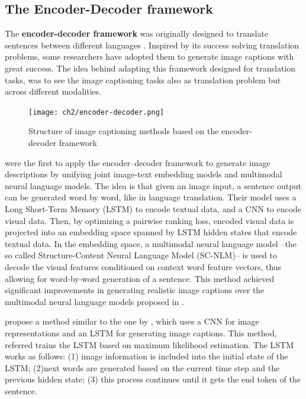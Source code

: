 \subsection{The Encoder-Decoder framework}\label{subsec:encoder-decoder_framework}

The \textbf{encoder-decoder framework} was originally designed to translate sentences between different languages \citep{Kalchbrenner2013, Sutskever2014, Cho2014}. Inspired by its success solving translation problems, some researchers have adopted them to generate image captions with great success. The idea behind adapting this framework designed for translation tasks, was to see the image captioning tasks also as translation problem but across different modalities. 

\begin{figure}[hpt]
	\centering
	\texttt{[image: ch2/encoder-decoder.png]}
	\caption{Structure of image captioning methods based on the encoder-decoder framework}
	\label{fig:encoder-decoder}
\end{figure}

\citet{Kiros2014_LBL} were the first to apply the encoder–decoder framework to generate image descriptions by unifying joint image-text embedding models and multimodal neural language models. The idea is that given an image input, a sentence output can be generated word by word, like in language translation. Their model uses a Long Short-Term Memory (LSTM) \citep{Hochreiter1997} to encode textual data, and a CNN to encode visual data. Then, by optimizing a pairwise ranking loss, encoded visual data is projected into an embedding space spanned by LSTM  hidden states that encode textual data. In the embedding space, a multimodal neural language model --the so called Structure-Content Neural Language Model (SC-NLM)-- is used to decode the visual features conditioned on context word feature vectors, thus allowing for word-by-word generation of a sentence. This method achieved significant improvements in generating realistic image captions over the multimodal neural language models proposed in \citep{Kiros2014_VS}.

\citet{Vinyals2015} propose a method similar to the one by \citet{Kiros2014_VS}, which uses a CNN for image representations and an LSTM for generating image captions. This method, referred trains the LSTM based on maximum likelihood estimation. The LSTM works as follows: (1) image information is included into the initial state of the LSTM; (2)next words are generated based on the current time step and the previous hidden state; (3) this process continues until it gets the end token of the sentence. 

